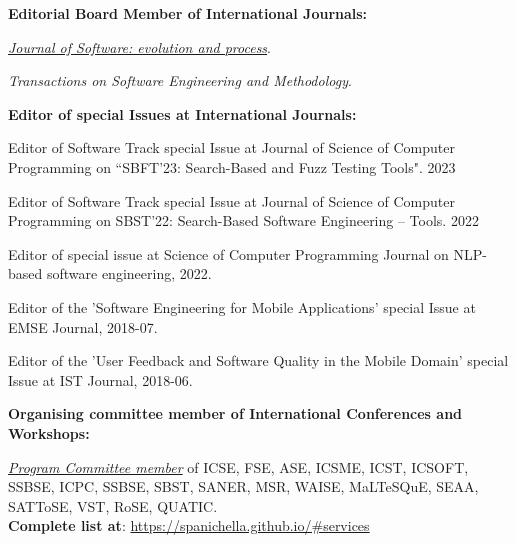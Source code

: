 \documentclass[11pt]{article}
\newcommand\on[1]{\nbc{ON}{#1}{red}} %
\begin{document}
\textbf{Editorial Board Member of International Journals:}
\begin{innerlist}
   \item \emph{
              \href{http://onlinelibrary.wiley.com/journal/10.1002/(ISSN)2047-7481��}
                   {Journal of Software: evolution and process}}.
   \item \emph{Transactions on Software Engineering and Methodology}.
\end{innerlist}
\medskip 
\textbf{Editor of special Issues at International Journals:}
\begin{innerlist}
\item Editor of Software Track special Issue at Journal of Science of Computer Programming on ``SBFT'23: Search-Based and Fuzz Testing Tools". 2023
\item Editor of Software Track special Issue at Journal of Science of Computer Programming on SBST’22: Search-Based Software Engineering – Tools. 2022
\item Editor of special issue at Science of Computer Programming Journal on NLP-based software engineering, 2022.
\item Editor of the 'Software Engineering for Mobile Applications' special Issue at EMSE Journal, 2018-07.
\item Editor of the 'User Feedback and Software Quality in the Mobile Domain' special Issue at IST Journal,  2018-06.
	
\end{innerlist}
\medskip 
\textbf{Organising committee member of International Conferences and Workshops:}
\begin{innerlist}
 \item \href{https://spanichella.github.io/#services}{\textit{Program Committee member}} of ICSE, FSE, ASE, ICSME, ICST, ICSOFT, SSBSE, ICPC, SSBSE, SBST, SANER, MSR, WAISE, MaLTeSQuE, SEAA, SATToSE, VST, RoSE, QUATIC. \\\textbf{Complete list at}: \href{https://spanichella.github.io/\#services}{https://spanichella.github.io/\#services}
 \end{innerlist}


\end{document}
